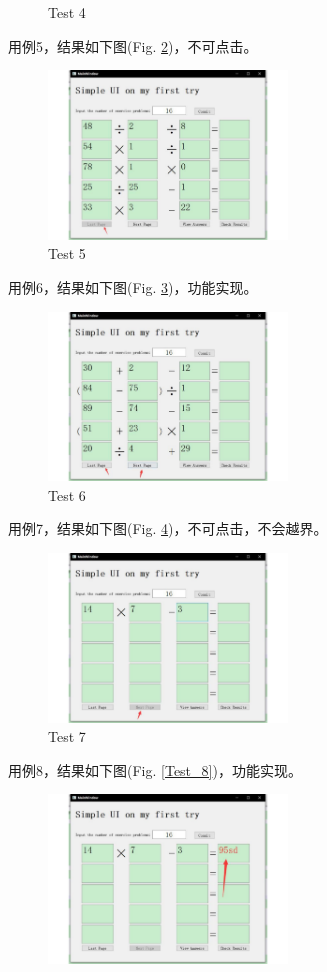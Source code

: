 \documentclass[10pt,journal,compsoc,fleqn]{IEEEtran}
\begin{document}
\begin{CJK}{UTF8}{song}
\begin{figure}[H]
  \caption{Test 4}
  \label{Test_4}
\end{figure}
用例5，结果如下图(Fig. \ref{Test_5})，不可点击。
\begin{figure}[H]
  \centering
  \includegraphics[width=2.5in]{./figures/5.pdf}
  \caption{Test 5}
  \label{Test_5}
\end{figure}
用例6，结果如下图(Fig. \ref{Test_6})，功能实现。
\begin{figure}[H]
  \centering
  \includegraphics[width=2.5in]{./figures/6.pdf}
  \caption{Test 6}
  \label{Test_6}
\end{figure}
用例7，结果如下图(Fig. \ref{Test_7})，不可点击，不会越界。
\begin{figure}[H]
  \centering
  \includegraphics[width=2.5in]{./figures/7.pdf}
  \caption{Test 7}
  \label{Test_7}
\end{figure}
用例8，结果如下图(Fig. \ref{Test_8})，功能实现。
\begin{figure}[H]
  \centering
  \includegraphics[width=2.5in]{./figures/8.pdf}

\end{figure}
\end{CJK}
\end{document}
